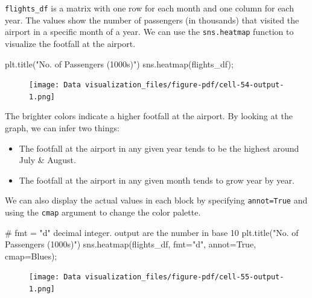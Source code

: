 \documentclass[
  letterpaper,
  DIV=11,
  numbers=noendperiod]{scrreprt}
\newenvironment{Shaded}{\begin{snugshade}}{\end{snugshade}}
\newcommand{\CommentTok}[1]{\textcolor[rgb]{0.37,0.37,0.37}{#1}}
\newcommand{\NormalTok}[1]{\textcolor[rgb]{0.00,0.23,0.31}{#1}}
\newcommand{\OperatorTok}[1]{\textcolor[rgb]{0.37,0.37,0.37}{#1}}
\newcommand{\StringTok}[1]{\textcolor[rgb]{0.13,0.47,0.30}{#1}}
\newcommand{\VariableTok}[1]{\textcolor[rgb]{0.07,0.07,0.07}{#1}}
\providecommand{\tightlist}{%
  \setlength{\itemsep}{0pt}\setlength{\parskip}{0pt}}\usepackage{longtable,booktabs,array}
\begin{document}
\texttt{flights\_df} is a matrix with one row for each month and one
column for each year. The values show the number of passengers (in
thousands) that visited the airport in a specific month of a year. We
can use the \texttt{sns.heatmap} function to visualize the footfall at
the airport.

\begin{Shaded}
\begin{Highlighting}[]
\NormalTok{plt.title(}\StringTok{"No. of Passengers (1000s)"}\NormalTok{)}
\NormalTok{sns.heatmap(flights\_df)}\OperatorTok{;}
\end{Highlighting}
\end{Shaded}

\begin{figure}[H]

{\centering \texttt{[image: Data visualization\_files/figure-pdf/cell-54-output-1.png]}

}

\end{figure}

The brighter colors indicate a higher footfall at the airport. By
looking at the graph, we can infer two things:

\begin{itemize}
\tightlist
\item
  The footfall at the airport in any given year tends to be the highest
  around July \& August.
\item
  The footfall at the airport in any given month tends to grow year by
  year.
\end{itemize}

We can also display the actual values in each block by specifying
\texttt{annot=True} and using the \texttt{cmap} argument to change the
color palette.

\begin{Shaded}
\begin{Highlighting}[]
\CommentTok{\# fmt = "d" decimal integer. output are the number in base 10}
\NormalTok{plt.title(}\StringTok{"No. of Passengers (1000s)"}\NormalTok{)}
\NormalTok{sns.heatmap(flights\_df, fmt}\OperatorTok{=}\StringTok{"d"}\NormalTok{, annot}\OperatorTok{=}\VariableTok{True}\NormalTok{, cmap}\OperatorTok{=}\StringTok{\textquotesingle{}Blues\textquotesingle{}}\NormalTok{)}\OperatorTok{;}
\end{Highlighting}
\end{Shaded}

\begin{figure}[H]

{\centering \texttt{[image: Data visualization\_files/figure-pdf/cell-55-output-1.png]}

}

\end{figure}
\end{document}
